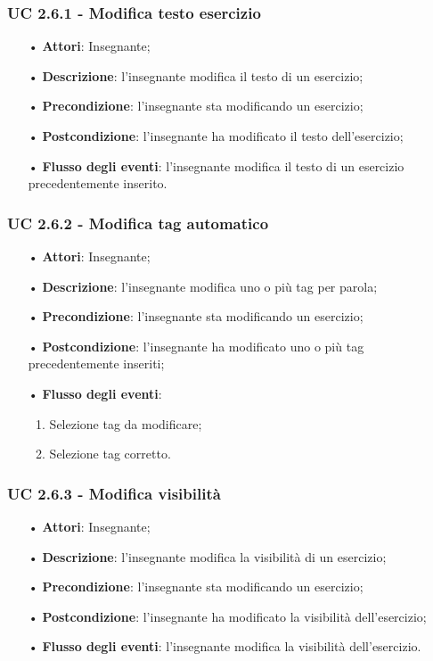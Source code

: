 \subsubsection{UC 2.6.1 - Modifica testo esercizio}
\begin{itemize}
	\item[•] \textbf{Attori}: Insegnante;
	\item[•] \textbf{Descrizione}: l'insegnante modifica il testo di un esercizio;
	\item[•] \textbf{Precondizione}: l'insegnante sta modificando un esercizio;
	\item[•] \textbf{Postcondizione}: l'insegnante ha modificato il testo dell'esercizio;
	\item[•] \textbf{Flusso degli eventi}: l'insegnante modifica il testo di un esercizio precedentemente inserito.
\end{itemize}


\subsubsection{UC 2.6.2 - Modifica tag automatico}
\begin{itemize}
	\item[•] \textbf{Attori}: Insegnante;
	\item[•] \textbf{Descrizione}: l'insegnante modifica uno o più tag per parola;
	\item[•] \textbf{Precondizione}: l'insegnante sta modificando un esercizio;
	\item[•] \textbf{Postcondizione}: l'insegnante ha modificato uno o più tag precedentemente inseriti;
\item[•] \textbf{Flusso degli eventi}:
\begin{enumerate}
		\item Selezione tag da modificare;
		\item Selezione tag corretto.
\end{enumerate}
\end{itemize}


\subsubsection{UC 2.6.3 - Modifica visibilità} 
\begin{itemize}
	\item[•] \textbf{Attori}: Insegnante;
	\item[•] \textbf{Descrizione}: l'insegnante modifica la visibilità di un esercizio;
	\item[•] \textbf{Precondizione}: l'insegnante sta modificando un esercizio;
	\item[•] \textbf{Postcondizione}: l'insegnante ha modificato la visibilità dell'esercizio;
	\item[•] \textbf{Flusso degli eventi}: l'insegnante modifica la visibilità dell'esercizio.
\end{itemize}



